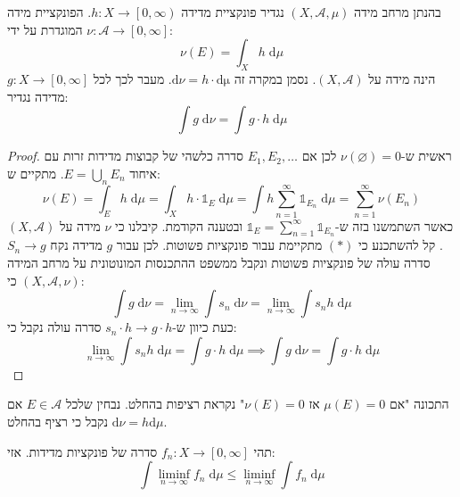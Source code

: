 \documentclass{tstextbook}
\begin{document}
\begin{proposition}
בהנתן מרחב מידה \(\left( X,\mathcal{ A, \mu} \right)\) נגדיר פונקציית מדידה \(h:X\to \left[ 0,\infty \right)\). הפונקציית מידה \(\nu:\mathcal{A}\to \left[ 0,\infty \right]\) המוגדרת על ידי:
$$\nu(E)=\int _{X}h \;\mathrm{d} \mu $$
הינה מידה על \(\left( X,\mathcal{A} \right)\). נסמן במקרה זה \(\mathrm{d}\nu=h\cdot \mathrm{d\mu}\). מעבר לכך לכל \(g:X\to\left[ 0,\infty \right]\) מדידה נגדיר:
$$\int g \;\mathrm{d} \nu = \int g \cdot h \;\mathrm{d} \mu  $$

\end{proposition}
\begin{proof}
ראשית ש-\(\nu\left( \varnothing \right)=0\) לכן אם \(E_{1},E_{2},\dots\) סדרה כלשהי של קבוצות מדידות זרות עם איחוד \(E=\bigcup_{n}E_{n}\). מתקיים ש:
$$\nu(E)=\int _{E}h \;\mathrm{d} \mu = \int _{X}h\cdot \mathbb{1} _{E} \;\mathrm{d} \mu = \int h \sum_{n=1}^{\infty} \mathbb{1}_{E_{n}} \;\mathrm{d} \mu   = \sum_{n=1}^{\infty} \nu(E_{n})$$
כאשר השתמשנו בזה ש-\(\mathbb{1}_{E}=\sum_{n=1}^{\infty}\mathbb{1}_{E_{n}}\) ובטענה הקודמת. קיבלנו כי \(\nu\) מידה על \(\left( X,\mathcal{ A} \right)\). קל להשתכנע כי \((*)\) מתקיימת עבור פונקציות פשוטות. לכן עבור \(g\) מדידה נקח \(S_{n}\to g\) סדרה עולה של פונקציות פשוטות ונקבל ממשפט ההתכנסות המונוטונית על מרחב המידה \(\left( X,\mathcal{A},\nu \right)\) כי:
$$\int g \;\mathrm{d} \nu =\lim_{ n \to \infty } \int s_{n} \;\mathrm{d} \nu = \lim_{ n \to \infty } \int s_{n}h \;\mathrm{d} \mu $$
כעת כיוון ש-\(s_{n}\cdot h \to g\cdot h\) סדרה עולה נקבל כי:
$$\lim_{ n \to \infty } \int s_{n}h \;\mathrm{d} \mu=\int g\cdot h \;\mathrm{d} \mu \implies \int g \;\mathrm{d} \nu=\int g\cdot h \;\mathrm{d} \mu  $$

\end{proof}
\begin{remark}
התכונה "אם \(\mu(E)=0\) אז \(\nu(E)=0\)" נקראת רציפות בהחלט. נבחין שלכל \(E \in \mathcal{A}\) אם \(\mathrm{d}\nu=h\mathrm{d}\mu\) נקבל כי רציף בהחלט.

\end{remark}
\begin{theorem}
תהי \(f_{n}:X\to \left[ 0,\infty \right]\) סדרה של פונקציות מדידות. אזי:
$$\int \liminf_{ n \to \infty }  f_{n}\;\mathrm{d} \mu \leq \liminf_{ n \to \infty } \int f_{n} \;\mathrm{d} \mu   $$

\end{theorem}
\end{document}
